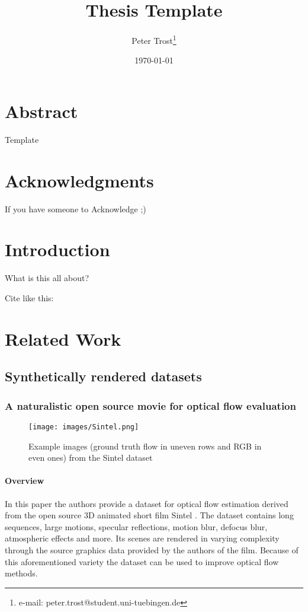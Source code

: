 \documentclass[a4paper,cleardoubleempty,BCOR1cm]{scrbook}
\title{Thesis Template}
\author{Peter Trost\thanks{e-mail: peter.trost@student.uni-tuebingen.de}}
\date{\today}
\begin{document}


\chapter*{Abstract}
Template

\chapter*{Acknowledgments}
If you have someone to Acknowledge ;)

\tableofcontents


\chapter{Introduction}
What is this all about?

Cite like this: \cite{agarwal2011}

\chapter{Related Work}
\section{Synthetically rendered datasets}
\subsection{A naturalistic open source movie for optical flow evaluation}
\cite{Butler:ECCV:2012}

\begin{figure}[h]
	\centering
	\texttt{[image: images/Sintel.png]}
	\caption{Example images (ground truth flow in uneven rows and RGB in even ones) from the Sintel dataset}
	\label{Sintel}
\end{figure}



\subsubsection{Overview}
In this paper the authors provide a dataset for optical flow estimation derived from the open source 3D animated short film Sintel
.
The dataset contains long sequences, large motions, specular reflections, motion blur, defocus blur, atmospheric effects and more. Its scenes are rendered in varying complexity through the source graphics data provided by the authors of the film. Because of this aforementioned variety the dataset can be used to improve optical flow methods. 
\end{document}
